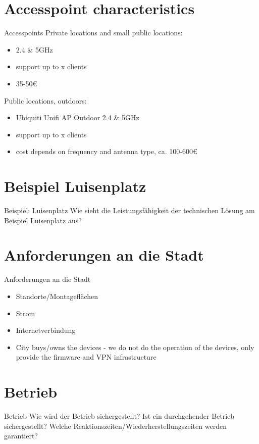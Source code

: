 \documentclass{beamer}
\begin{document}
\section{Accesspoint characteristics}
\begin{frame}{Accesspoints}
\vfill
Private locations and small public locations:
\begin{itemize}
\item 2.4 \& 5GHz
\item support up to x clients
\item 35-50\euro{}
\end{itemize}
\vfill

Public locations, outdoors:
\begin{itemize}
\item Ubiquiti Unifi AP Outdoor 2.4 \& 5GHz
\item support up to x clients
\item cost depends on frequency and antenna type, ca. 100-600\euro{}
\end{itemize}
\vfill
\end{frame}

\section{Beispiel Luisenplatz}
\begin{frame}{Beispiel: Luisenplatz}
Wie sieht die Leistungsfähigkeit der technischen Lösung am Beispiel Luisenplatz aus?
\end{frame}

\section{Anforderungen an die Stadt}
\begin{frame}{Anforderungen an die Stadt}
\begin{itemize}
\item{Standorte/Montageflächen}
\item{Strom}
\item{Internetverbindung}
\item{City buys/owns the devices - we do not do the operation of the devices, only provide the firmware and VPN infrastructure}
\end{itemize}
\end{frame}

\section{Betrieb}
\begin{frame}{Betrieb}
Wie wird der Betrieb sichergestellt?
Ist ein durchgehender Betrieb sichergestellt?
Welche Reaktionszeiten/Wiederherstellungszeiten werden garantiert?
\end{frame}
\end{document}
